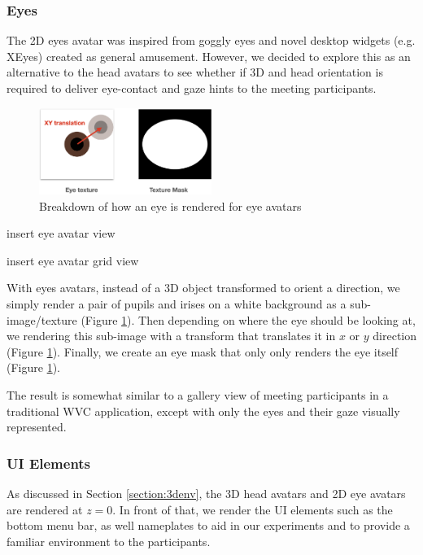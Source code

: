 \subsubsection{Eyes}

The 2D eyes avatar was inspired from goggly eyes and novel desktop widgets (e.g. XEyes\cite{RN50}) created as general amusement. However, we decided to explore this as an alternative to the head avatars to see whether if 3D and head orientation is required to deliver eye-contact and gaze hints to the meeting participants. 

\begin{figure}
	\centering
 	\includegraphics[width=0.5\textwidth]{eyebreakdown.png}
	\caption{Breakdown of how an eye is rendered for eye avatars}
	\label{fig:eyebreakdown}
\end{figure}

insert eye avatar view

insert eye avatar grid view

With eyes avatars, instead of a 3D object transformed to orient a direction, we simply render a pair of pupils and irises on a white background as a sub-image/texture (Figure \ref{fig:eyebreakdown}). Then depending on where the eye should be looking at, we rendering this sub-image with a transform that translates it in $x$ or $y$ direction (Figure \ref{fig:eyebreakdown}). Finally, we create an eye mask that only only renders the eye itself (Figure \ref{fig:eyebreakdown}).

The result is somewhat similar to a gallery view of meeting participants in a traditional WVC application, except with only the eyes and their gaze visually represented.

\subsubsection{UI Elements}

As discussed in Section \ref{section:3denv}, the 3D head avatars and 2D eye avatars are rendered at $z=0$. In front of that, we render the UI elements such as the bottom menu bar, as well nameplates to aid in our experiments and to provide a familiar environment to the participants.

